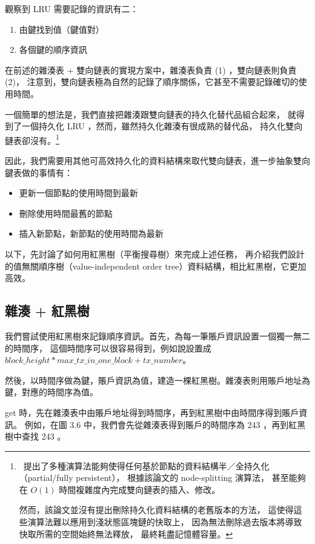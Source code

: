 觀察到 LRU 需要記錄的資訊有二：

\begin{enumerate}
  \item 由鍵找到值（鍵值對）
  \item 各個鍵的順序資訊
\end{enumerate}

在前述的雜湊表 + 雙向鏈表的實現方案中，雜湊表負責 (1) ，雙向鏈表則負責 (2)，
注意到，雙向鏈表極為自然的記錄了順序關係，它甚至不需要記錄確切的使用時間。

一個簡單的想法是，我們直接把雜湊跟雙向鏈表的持久化替代品組合起來，
就得到了一個持久化 LRU ，然而，雖然持久化雜湊有很成熟的替代品，
持久化雙向鏈表卻沒有。\footnote{
~\cite{driscoll1986making}提出了多種演算法能夠使得任何基於節點的資料結構半／全持久化（partial/fully persistent），
根據該論文的 node-splitting 演算法，
甚至能夠在 $O(1)$ 時間複雜度內完成雙向鏈表的插入、修改。

然而，該論文並沒有提出刪除持久化資料結構的老舊版本的方法，
這使得這些演算法難以應用到淺狀態區塊鏈的快取上，
因為無法刪除過去版本將導致快取所需的空間始終無法釋放，
最終耗盡記憶體容量。
}

因此，我們需要用其他可高效持久化的資料結構來取代雙向鏈表，進一步抽象雙向鍵表做的事情有：

\begin{itemize}
  \item 更新一個節點的使用時間到最新
  \item 刪除使用時間最舊的節點
  \item 插入新節點，新節點的使用時間為最新
\end{itemize}

以下，先討論了如何用紅黑樹\cite{guibas1978dichromatic}（平衡搜尋樹）來完成上述任務，
再介紹我們設計的值無關順序樹（value-independent order tree）資料結構，相比紅黑樹，它更加高效。

\subsection{雜湊 + 紅黑樹}

我們嘗試使用紅黑樹來記錄順序資訊。首先，為每一筆賬戶資訊設置一個獨一無二的時間序，
這個時間序可以很容易得到，例如說設置成 $block\_height * max\_tx\_in\_one\_block + tx\_number$。

然後，以時間序做為鍵，賬戶資訊為值，建造一棵紅黑樹。雜湊表則用賬戶地址為鍵，對應的時間序為值。

get 時，先在雜湊表中由賬戶地址得到時間序，再到紅黑樹中由時間序得到賬戶資訊。
例如，在圖 3.6 中，我們會先從雜湊表得到賬戶的時間序為 243 ，再到紅黑樹中查找 243 。

